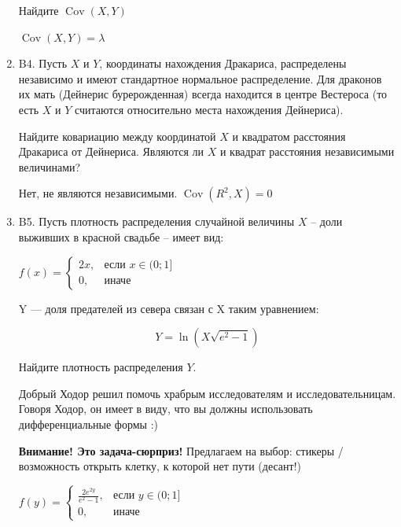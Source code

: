 \documentclass[12pt]{article}
\DeclareMathOperator{\Cov}{Cov}
\newenvironment{problem}{}{}
\newenvironment{sol}{}{} %
\begin{document}
\begin{enumerate}
\begin{problem}
Найдите $\Cov(X,Y)$

\begin{sol}
$\Cov(X,Y) = \lambda$
\end{sol}
\end{problem}

\begin{problem}
\item[B4.] Пусть $X$ и $Y$, координаты нахождения Дракариса, распределены независимо и имеют стандартное нормальное распределение. Для драконов их мать (Дейнерис бурерожденная) всегда находится в центре Вестероса (то есть $X$ и $Y$ считаются относительно места нахождения Дейнериса). 

Найдите ковариацию между координатой $X$ и квадратом расстояния Дракариса от Дейнериса. Являются ли $X$ и квадрат расстояния независимыми величинами?

\begin{sol}
Нет, не являются независимыми. $\Cov(R^2, X) = 0$
\end{sol}
\end{problem}

\begin{problem}
\item[B5.] Пусть плотность распределения случайной величины $X$ – доли выживших в красной свадьбе – имеет вид:
\begin{center} $f(x) = \begin{cases} 2x, & \mbox{если } x \in (0;1] \\ 0 , & \mbox{иначе }  \end{cases}$  \end{center}
Y — доля предателей из севера связан с X таким уравнением:

\[Y = \ln(X\sqrt{e^2-1})\]

Найдите плотность распределения $Y$.

Добрый Ходор решил помочь храбрым исследователям и исследовательницам. Говоря Ходор, он имеет в виду, что вы должны использовать дифференциальные формы :)

\begin{sol}
\textbf{Внимание! Это задача-сюрприз!} Предлагаем на выбор: стикеры / возможность открыть клетку, к которой нет пути (десант!)

$f(y) = \begin{cases} \frac{2e^{2y}}{e^2 - 1}, & \mbox{если } y \in (0;1] \\ 0 , & \mbox{иначе }  \end{cases}$ 
\end{sol}
\end{problem}
\end{enumerate}
\end{document}
